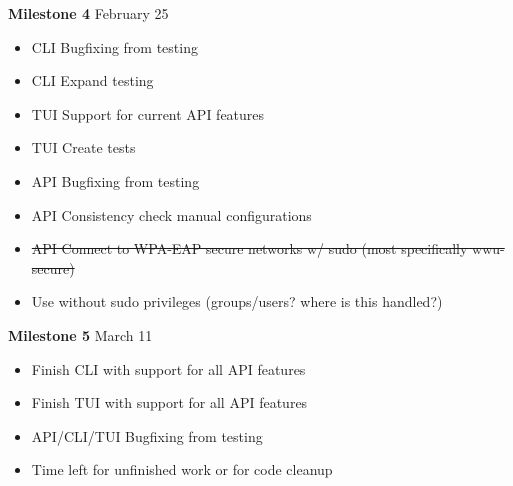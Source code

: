 \documentclass[11pt]{article}
\begin{document}
\textbf{Milestone 4} February 25
\begin{itemize}
  \item CLI Bugfixing from testing
  \item CLI Expand testing
  \item TUI Support for current API features
  \item TUI Create tests
  \item API Bugfixing from testing
  \item API Consistency check manual configurations
  \item\sout{API Connect to WPA-EAP secure networks w/ sudo (most specifically wwu-secure)}
  \item Use without sudo privileges (groups/users? where is this handled?)
\end{itemize}

\textbf{Milestone 5} March 11
\begin{itemize}
  \item Finish CLI with support for all API features
  \item Finish TUI with support for all API features
  \item API/CLI/TUI Bugfixing from testing
  \item Time left for unfinished work or for code cleanup
\end{itemize}
\end{document}
